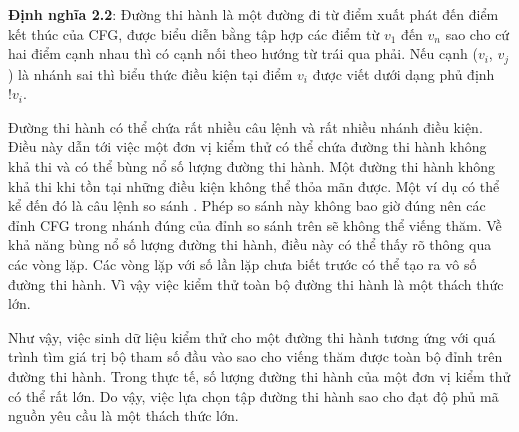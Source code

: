 \textbf{Định nghĩa 2.2}\cite{GiaoTrinhKiemThu}: Đường thi hành là một đường đi từ điểm xuất phát đến điểm kết thúc của CFG, được biểu diễn bằng tập hợp các điểm từ $v_1$ đến $v_n$ sao cho cứ hai điểm cạnh nhau thì có cạnh nối theo hướng từ trái qua phải. Nếu cạnh ($v_i$, $v_j$) là nhánh sai thì biểu thức điều kiện tại điểm $v_i$ được viết dưới dạng phủ định $!v_i$.

Đường thi hành có thể chứa rất nhiều câu lệnh và rất nhiều nhánh điều kiện. Điều này dẫn tới việc một đơn vị kiểm thử có thể chứa đường thi hành không khả thi và có thể bùng nổ số lượng đường thi hành. Một đường thi hành không khả thi khi tồn tại những điều kiện không thể thỏa mãn được. Một ví dụ có thể kể đến đó là câu lệnh so sánh . Phép so sánh này không bao giờ đúng nên các đỉnh CFG trong nhánh đúng của đỉnh so sánh trên sẽ không thể viếng thăm. Về khả năng bùng nổ số lượng đường thi hành, điều này có thể thấy rõ thông qua các vòng lặp. Các vòng lặp với số lần lặp chưa biết trước có thể tạo ra vô số đường thi hành. Vì vậy việc kiểm thử toàn bộ đường thi hành là một thách thức lớn.

Như vậy, việc sinh dữ liệu kiểm thử cho một đường thi hành tương ứng với quá trình tìm giá trị bộ tham số đầu vào sao cho viếng thăm được toàn bộ đỉnh trên đường thi hành. Trong thực tế, số lượng đường thi hành của một đơn vị kiểm thử có thể rất lớn. Do vậy, việc lựa chọn tập đường thi hành sao cho đạt độ phủ mã nguồn yêu cầu là một thách thức lớn.

